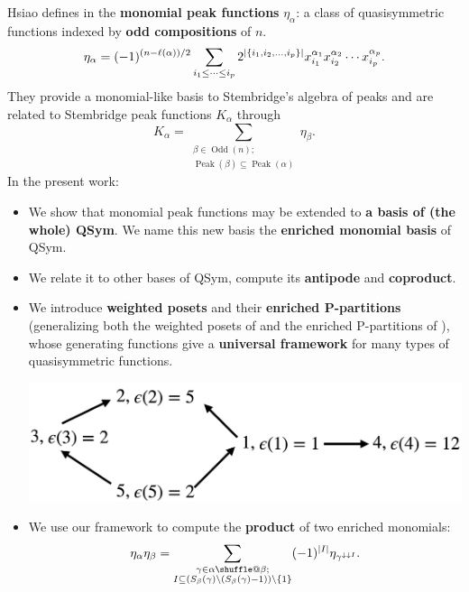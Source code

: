 \documentclass[numbers=enddot,12pt,final,onecolumn,notitlepage]{scrartcl}%
\makeatletter
\newcommand{\al}{\alpha}
\newcommand{\be}{\beta}
\newcommand{\Odd}{\operatorname{Odd}}
\newcommand{\Peak}{\operatorname{Peak}}
\providecommand*{\shuffle}{%
  \mathbin{\mathpalette\shuffle@{}}%
}
\newcommand*{\shuffle@}[2]{%
  \sbox0{$#1\vcenter{}$}%
  \kern .15\ht0 %
  \rlap{\vrule height .25\ht0 depth 0pt width 2.5\ht0}%
  \raise.1\ht0\hbox to 2.5\ht0{%
    \vrule height 1.75\ht0 depth -.1\ht0 width .17\ht0 %
    \hfill
    \vrule height 1.75\ht0 depth -.1\ht0 width .17\ht0 %
    \hfill
    \vrule height 1.75\ht0 depth -.1\ht0 width .17\ht0 %
  }%
  \kern .15\ht0 %
}
\newcommand{\0}{\phantom{c}}
\let\sumnonlimits\sum
\renewcommand{\sum}{\sumnonlimits\limits}
\makeatother
\begin{document}
\begin{tcolorbox}[colback=cyan!5,colframe=cyan!75!black, fonttitle=\bfseries,title=Summary of our work] Hsiao defines in \cite{Hsi07} the \textbf{monomial peak functions} $\eta_{\al}$: a class of quasisymmetric functions indexed by \textbf{odd compositions} of $n$.
\begin{equation*}
\eta_{\al} = (-1)^{(n-\ell(\al))/2}\sum\limits_{\substack{i_1 \leq \dots \leq i_p}}2^{|\{i_1,i_2,\dots,i_p\}|} x_{i_1}^{\al_1}x_{i_2}^{\al_2} \cdots x_{i_p}^{\al_p}.
\end{equation*}
They provide a monomial-like basis to Stembridge's algebra of peaks \cite{Ste97} and are related to Stembridge peak functions $K_\al$ through
\begin{equation*}
K_{\al} = \sum_{{\substack{\beta \in \Odd(n);\\ \Peak(\beta) \subseteq \Peak(\al)}}} \eta_{\beta}.
\end{equation*}
In the present work: 
\begin{itemize}
\item We show that monomial peak functions may be extended to \textbf{a basis of (the whole) QSym}. We name this new basis the \textbf{enriched monomial basis} of QSym.
\item We relate it to other bases of QSym, compute its \textbf{antipode} and \textbf{coproduct}. 
\item We introduce \textbf{weighted posets} and their \textbf{enriched P-partitions} (generalizing both the weighted posets of 
\cite{Gri17} and the enriched P-partitions of \cite{Ste97}), whose generating functions give a \textbf{universal framework} for many types of quasisymmetric functions.

\begin{center}
\includegraphics[scale=0.16]{Poset.png}
\end{center}
 
\item We use our framework to compute the \textbf{product} of two enriched monomials:
\begin{equation*}
\eta_\al \eta_\beta
= \sum_{\substack{\gamma \in \al \shuffle \be ;\\
                   I\subseteq \left(S_{\be}(\gamma)\setminus (S_{\be}(\gamma)-1)\right) \setminus \left\{1\right\}}}
(-1)^{|I|}\eta_{\gamma^{\downarrow\downarrow I}} .
\end{equation*}
\end{itemize}
\end{tcolorbox}
\end{document}
